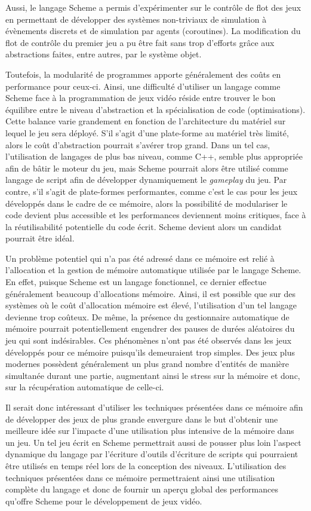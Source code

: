 \documentclass[12pt,twoside,letterpaper,francais]{book}
\begin{document}
Aussi, le langage Scheme a permis d'expérimenter sur le contrôle de
flot des jeux en permettant de développer des systèmes non-triviaux de
simulation à évènements discrets et de simulation par agents
(coroutines). La modification du flot de contrôle du premier jeu a pu
être fait sans trop d'efforts grâce aux abstractions faites, entre
autres, par le système objet.

Toutefois, la modularité de programmes apporte généralement des coûts
en performance pour ceux-ci. Ainsi, une difficulté d'utiliser un
langage comme Scheme face à la programmation de jeux vidéo réside
entre trouver le bon équilibre entre le niveau d'abstraction et la
spécialisation de code (optimisations). Cette balance varie grandement
en fonction de l'architecture du matériel sur lequel le jeu sera
déployé. S'il s'agit d'une plate-forme au matériel très limité, alors
le coût d'abstraction pourrait s'avérer trop grand. Dans un tel cas,
l'utilisation de langages de plus bas niveau, comme C++, semble plus
appropriée afin de bâtir le moteur du jeu, mais Scheme pourrait alors
être utilisé comme langage de script afin de développer dynamiquement
le \textit{gameplay} du jeu. Par contre, s'il s'agit de plate-formes
performantes, comme c'est le cas pour les jeux développés dans le
cadre de ce mémoire, alors la possibilité de modulariser le code
devient plus accessible et les performances deviennent moins
critiques, face à la réutilisabilité potentielle du code écrit. Scheme
devient alors un candidat pourrait être idéal.

Un problème potentiel qui n'a pas été adressé dans ce mémoire est
relié à l'allocation et la gestion de mémoire automatique utilisée par
le langage Scheme. En effet, puisque Scheme est un langage
fonctionnel, ce dernier effectue généralement beaucoup d'allocations
mémoire. Ainsi, il est possible que sur des systèmes où le coût
d'allocation mémoire est élevé, l'utilisation d'un tel langage
devienne trop coûteux. De même, la présence du gestionnaire
automatique de mémoire pourrait potentiellement engendrer des pauses
de durées aléatoires du jeu qui sont indésirables. Ces phénomènes
n'ont pas été observés dans les jeux développés pour ce mémoire
puisqu'ils demeuraient trop simples. Des jeux plus modernes possèdent
généralement un plus grand nombre d'entités de manière simultanée
durant une partie, augmentant ainsi le stress sur la mémoire et donc,
sur la récupération automatique de celle-ci.

Il serait donc intéressant d'utiliser les techniques présentées dans
ce mémoire afin de développer des jeux de plus grande envergure dans
le but d'obtenir une meilleure idée sur l'impacte d'une utilisation
plus intensive de la mémoire dans un jeu. Un tel jeu écrit en Scheme
permettrait aussi de pousser plus loin l'aspect dynamique du langage
par l'écriture d'outils d'écriture de scripts qui pourraient être
utilisés en temps réel lors de la conception des
niveaux. L'utilisation des techniques présentées dans ce mémoire
permettraient ainsi une utilisation complète du langage et donc de
fournir un aperçu global des performances qu'offre Scheme pour le
dévelop\-pement de jeux vidéo.



\singlespacing


\appendix
\end{document}
